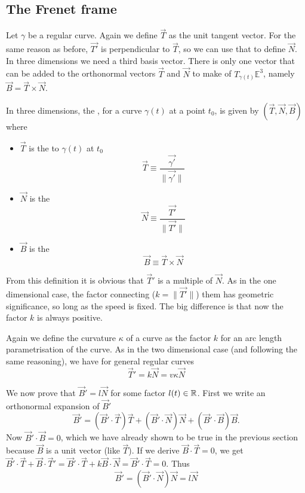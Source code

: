 \subsection{The Frenet frame}
Let $\gamma$ be a regular curve. Again we define $\vec{T}$ as the unit tangent vector. For the same reason as before, $\vec{T'}$ is perpendicular to $\vec{T}$, so we can use that to define $\vec{N}$. In three dimensions we need a third basis vector. There is only one vector that can be added to the orthonormal vectors $\vec{T}$ and $\vec{N}$ to make  of $T_{\gamma(t)}\mathbb{E}^3$, namely $\vec{B} = \vec{T}\times \vec{N}$.
\begin{definition}
In three dimensions, the , for a curve $\gamma(t)$ at a point $t_0$, is given by $(\vec{T}, \vec{N}, \vec{B})$ where
\begin{itemize}
\item $\vec{T}$ is the  to $\gamma(t)$ at $t_0$
\[ \vec{T} \equiv \frac{\vec{\gamma'}}{\lVert \vec{\gamma'} \lVert} \]
\item $\vec{N}$ is the 
\[ \vec{N} \equiv \frac{\vec{T'}}{\lVert \vec{T'} \lVert} \]
\item $\vec{B}$ is the 
\[ \vec{B} \equiv \vec{T}\times \vec{N} \]
\end{itemize}
\end{definition}

From this definition it is obvious that $\vec{T}'$ is a multiple of $\vec{N}$. As in the one dimensional case, the factor connecting ($k = \lVert \vec{T'} \lVert$) them has geometric significance, so long as the speed is fixed. The big difference is that now the factor $k$ is always positive.

Again we define the curvature $\kappa$ of a curve as the factor $k$ for an arc length parametrisation of the curve. As in the two dimensional case (and following the same reasoning), we have for general regular curves
\[ \vec{T}' = k \vec{N} = v \kappa \vec{N} \]

We now prove that $\vec{B}'= l \vec{N}$ for some factor $l(t)\in \mathbb{R}$. First we write an orthonormal expansion of $\vec{B}'$
\[ \vec{B}' = (\vec{B}'\cdot \vec{T})\vec{T} + (\vec{B}'\cdot \vec{N})\vec{N} + (\vec{B}'\cdot \vec{B})\vec{B}. \]
Now $\vec{B}'\cdot \vec{B}=0$, which we have already shown to be true in the previous section because $\vec{B}$ is a unit vector (like $\vec{T}$). If we derive $\vec{B}\cdot \vec{T} = 0$, we get $\vec{B}'\cdot \vec{T} + \vec{B}\cdot \vec{T}' = \vec{B}'\cdot \vec{T} + k \vec{B}\cdot \vec{N} = \vec{B}'\cdot \vec{T} = 0$. Thus 
\[ \vec{B}' = (\vec{B}'\cdot \vec{N})\vec{N} = l \vec{N} \]

